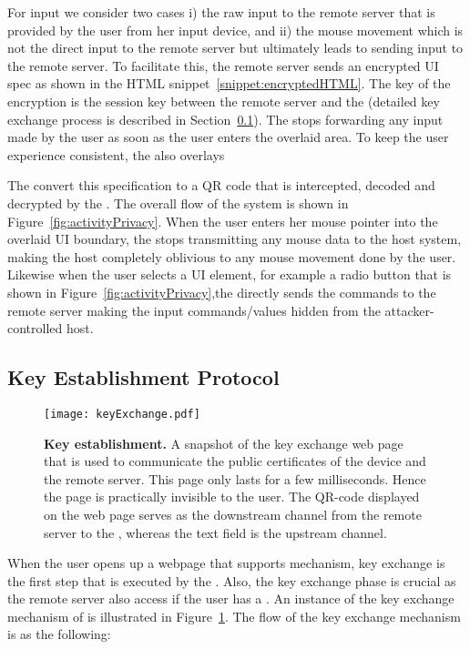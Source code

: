 For input we consider two cases i) the raw input to the remote server that is provided by the user from her input device, and ii) the mouse movement which is not the direct input to the remote server but ultimately leads to sending input to the remote server. To facilitate this, the remote server sends an encrypted UI spec as shown in the HTML snippet~\ref{snippet:encryptedHTML}. The key of the encryption is the session \tls key between the remote server and the \device (detailed key exchange process is described in Section~\ref{sec:systemDesign:keyEstablishment}). The \device stops forwarding any input made by the user as soon as the user enters the overlaid area. To keep the user experience consistent, the \device also overlays  

 The \name \js convert this specification to a QR code that is intercepted, decoded and decrypted by the \device. The overall flow of the system is shown in Figure~\ref{fig:activityPrivacy}. When the user enters her mouse pointer into the overlaid UI boundary, the \device stops transmitting any mouse data to the host system, making the host completely oblivious to any mouse movement done by the user. Likewise when the user selects a UI element, for example a radio button that is shown in Figure~\ref{fig:activityPrivacy},the \device directly sends the commands to the remote server making the input commands/values hidden from the attacker-controlled host.  



\subsection{Key Establishment Protocol}
\label{sec:systemDesign:keyEstablishment}

\begin{figure}[t]
\centering
\texttt{[image: keyExchange.pdf]}
\caption{\textbf{Key establishment.} A snapshot of the key exchange web page that is used to communicate the public certificates of the device and the remote server. This page only lasts for a few milliseconds. Hence the page is practically invisible to the user. The QR-code displayed on the web page serves as the downstream channel from the remote server to the \device, whereas the text field is the upstream channel.}
\label{fig:keyExchange}
\centering
\end{figure}


When the user opens up a webpage that supports \name mechanism, key exchange is the first step that is executed by the \device. Also, the key exchange phase is crucial as the remote server also access if the user has a \device. An instance of the key exchange mechanism of \name is illustrated in Figure~\ref{fig:keyExchange}. The flow of the key exchange mechanism is as the following:

